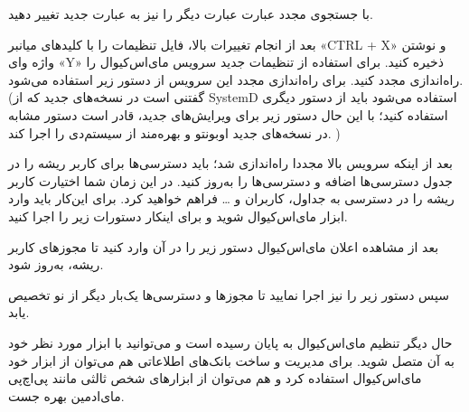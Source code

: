 \begin{latin}  
    
\end{latin}
با جستجوی مجدد عبارت 
عبارت دیگر را نیز به عبارت جدید 
 تغییر دهید.
 \newline
 \begin{latin}  
     
 \end{latin}
 بعد از انجام تغییرات بالا، فایل تنظیمات را با کلید‌های میانبر «CTRL + X» و نوشتن واژه وای «Y» ذخیره کنید. برای استفاده از تنظیمات جدید سرویس مای‌اس‌کیوال را راه‌اندازی مجدد کنید. برای راه‌اندازی مجدد این سرویس از دستور زیر استفاده می‌شود. (گفتنی است در نسخه‌های جدید که از SystemD استفاده می‌شود باید از دستور دیگری استفاده کنید؛ با این حال دستور زیر برای ویرایش‌های جدید، قادر است دستور مشابه در  نسخه‌های جدید اوبونتو و بهره‌مند از سیستم‌دی را اجرا کند. )
 \newline
 \begin{latin}  
     
    \end{latin}
بعد از اینکه سرویس بالا مجددا راه‌اندازی شد؛ باید دسترسی‌ها برای کاربر ریشه را در جدول دسترسی‌ها اضافه و دسترسی‌ها را به‌روز کنید. در این زمان شما اختیارت کاربر ریشه را در دسترسی به جداول، کاربران و … فراهم خواهید کرد. برای این‌کار باید وارد ابزار مای‌اس‌کیوال شوید و برای اینکار دستورات زیر را اجرا کنید.
\newline
\begin{latin}  
    
\end{latin}
بعد از مشاهده اعلان مای‌اس‌کیوال دستور زیر را در آن وارد کنید تا مجوزهای کاربر ریشه، به‌روز شود.
\newline
\begin{latin}  
    
\end{latin}

سپس دستور زیر را نیز اجرا نمایید تا مجوزها و دسترسی‌ها یک‌بار دیگر از نو تخصیص یابد.
\newline
\begin{latin}  
    
\end{latin}
حال دیگر تنظیم مای‌اس‌کیوال به پایان رسیده است و می‌توانید با ابزار مورد نظر خود به آن متصل شوید. برای مدیریت و ساخت بانک‌های اطلاعاتی هم می‌توان از ابزار خود مای‌اس‌کیوال استفاده کرد و هم می‌توان از ابزارهای شخص ثالثی مانند پی‌اچ‌پی مای‌ادمین بهره جست.